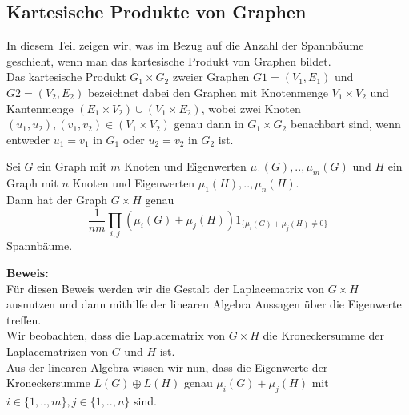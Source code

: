 \subsection{Kartesische Produkte von Graphen}
In diesem Teil zeigen wir, was im Bezug auf die Anzahl der Spannbäume geschieht, wenn man das kartesische Produkt von Graphen bildet.\\
Das kartesische Produkt $G_1\times G_2$ zweier Graphen $G1=(V_1,E_1)$ und $G2=(V_2,E_2)$ bezeichnet dabei den Graphen mit Knotenmenge $V_1\times V_2$ und Kantenmenge $(E_1\times V_2)\cup(V_1\times E_2)$, wobei zwei Knoten $(u_1,u_2), (v_1,v_2) \in (V_1\times V_2)$ genau dann in $G_1\times G_2$ benachbart sind, wenn entweder $u_1=v_1$ in $G_1$ oder $u_2=v_2$ in $G_2$ ist.\\
\begin{Tms}
 Sei $G$ ein Graph mit $m$ Knoten und Eigenwerten $\mu_1(G),..,\mu_m(G)$ und $H$ ein Graph mit $n$ Knoten und Eigenwerten $\mu_1(H),..,\mu_n(H)$. \\
Dann hat der Graph $G \times H$ genau
\begin{equation}
\frac{1}{nm}\displaystyle\prod_{i,j}(\mu_i(G)+\mu_j(H))1_{\{\mu_i(G)+\mu_j(H)\neq0\}}
\end{equation}
Spannbäume.
\end{Tms}
\textbf{Beweis:}\\
Für diesen Beweis werden wir die Gestalt der Laplacematrix von $G \times H$ ausnutzen und dann mithilfe der linearen Algebra Aussagen über die Eigenwerte treffen.\\
Wir beobachten, dass die Laplacematrix von $G\times H$ die Kroneckersumme der Laplacematrizen von $G$ und $H$ ist.\\
Aus der linearen Algebra wissen wir nun, dass die Eigenwerte der Kroneckersumme $L(G) \oplus L(H)$ genau $\mu_i(G)+\mu_j(H)$ mit $i \in \{ 1,..,m\}, j \in \{ 1,..,n\}$ sind.\\
